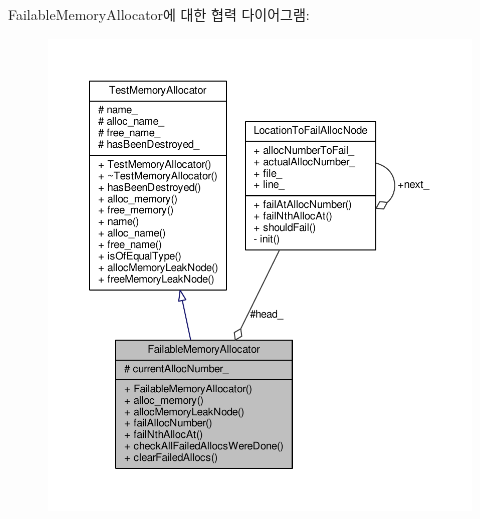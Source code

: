 Failable\+Memory\+Allocator에 대한 협력 다이어그램\+:
\nopagebreak
\begin{figure}[H]
\begin{center}
\leavevmode
\includegraphics[width=350pt]{class_failable_memory_allocator__coll__graph}
\end{center}
\end{figure}
